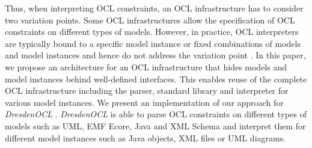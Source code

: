 	Thus, when interpreting OCL constraints, an OCL infrastructure has to consider two 
	variation points. Some OCL infrastructures allow the specification of OCL constraints 
	on different types of models. However, in practice, OCL interpreters are typically bound 
	to a specific  model instance or  fixed combinations of models and model instances 
	 and hence do not address the  variation point .
  In this paper, we propose an architecture for an OCL
	infrastructure that hides models and model instances behind well-defined interfaces.
	This enables reuse of the complete OCL infrastructure including the  parser, 
	standard library and interpreter for various  model instances. We present an
	implementation of our approach for \textit{DresdenOCL}
	\cite{WWW:dresdenOCL}. \textit{DresdenOCL} is able to parse OCL
	constraints on different types of models such as UML, EMF Ecore, Java and 
	XML Schema and interpret them for different model instances such as Java 
	objects, XML files or {UML diagrams}.
	
		
